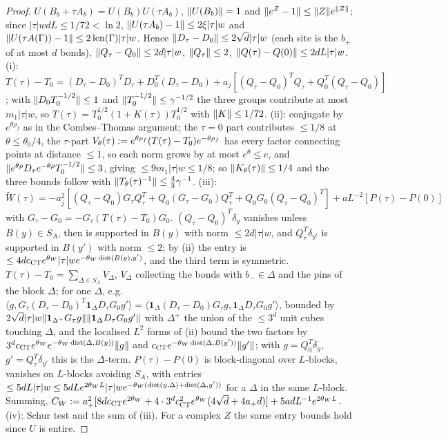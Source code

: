 \begin{proof}
$U(B_b+\tau A_b)=U(B_b)U(\tau A_b)$, $\lVert U(B_b)\rVert=1$ and $\lVert e^Z-1\rVert\le\lVert Z\rVert e^{\lVert Z\rVert}$; since $|\tau|wdL\le1/72<\ln2$, $\lVert U(\tau A_b)-1\rVert\le2\xi|\tau|w$ and $\lVert U(\tau A(\Gamma))-1\rVert\le2\,\mathrm{len}(\Gamma)|\tau|w$. Hence $\lVert D_\tau-D_0\rVert\le2\sqrt d|\tau|w$ (each site is the $b_+$ of at most $d$ bonds), $\lVert Q_\tau-Q_0\rVert\le2d|\tau|w$, $\lVert Q_\tau\rVert\le2$, $\lVert Q(\tau)-Q(0)\rVert\le2dL|\tau|w$. (i): $T(\tau)-T_0=(D_\tau-D_0)^TD_\tau+D_0^T(D_\tau-D_0)+a_j[(Q_\tau-Q_0)^TQ_\tau+Q_0^T(Q_\tau-Q_0)]$; with $\lVert D_0T_0^{-1/2}\rVert\le1$ and $\lVert T_0^{-1/2}\rVert\le\gamma^{-1/2}$ the three groups contribute at most $m_1|\tau|w$, so $T(\tau)=T_0^{1/2}(1+K(\tau))T_0^{1/2}$ with $\lVert K\rVert\le1/72$. (ii): conjugate by $e^{\theta\rho_f}$ as in the Combes--Thomas argument; the $\tau=0$ part contributes $\le1/8$ at $\theta\le\theta_0/4$, the $\tau$-part $V_\theta(\tau):= e^{\theta\rho_f}(T(\tau)-T_0)e^{-\theta\rho_f}$ has every factor connecting points at distance $\le1$, so each norm grows by at most $e^\theta\le e$, and $\lVert e^{\theta\rho}D_\tau e^{-\theta\rho}T_0^{-1/2}\rVert\le3$, giving $\le9m_1|\tau|w\le1/8$; so $\lVert K_\theta(\tau)\rVert\le1/4$ and the three bounds follow with $\lVert T_\theta(\tau)^{-1}\rVert\le\frac43\gamma^{-1}$. (iii): $\tilde W(\tau)=-a_j^2[(Q_\tau-Q_0)G_\tau Q_\tau^T+Q_0(G_\tau-G_0)Q_\tau^T+Q_0G_0(Q_\tau-Q_0)^T]+aL^{-2}[P(\tau)-P(0)]$ with $G_\tau-G_0=-G_\tau(T(\tau)-T_0)G_0$. $(Q_\tau-Q_0)^T\delta_y$ vanishes unless $B(y)\in S_A$, then is supported in $B(y)$ with norm $\le2d|\tau|w$, and $Q_\tau^T\delta_{y'}$ is supported in $B(y')$ with norm $\le2$; by (ii) the entry is $\le4dc_{\mathrm{CT}}e^{\theta_W}|\tau|we^{-\theta_W\operatorname{dist}(B(y),y')}$, and the third term is symmetric. $T(\tau)-T_0=\sum_{\Delta\in S_A}V_\Delta$, $V_\Delta$ collecting the bonds with $b_-\in\Delta$ and the pins of the block $\Delta$; for one $\Delta$, e.g.\ $\langle g,G_\tau(D_\tau-D_0)^T\mathbf 1_\Delta D_\tau G_0g'\rangle=\langle\mathbf 1_\Delta(D_\tau-D_0)G_\tau g,\mathbf 1_\Delta D_\tau G_0g'\rangle$, bounded by $2\sqrt d|\tau|w\lVert \mathbf 1_{\Delta^+}G_\tau g\rVert\lVert \mathbf 1_\Delta D_\tau G_0g'\rVert$ with $\Delta^+$ the union of the $\le3^d$ unit cubes touching $\Delta$, and the localised $L^2$ forms of (ii) bound the two factors by $3^dc_{\mathrm{CT}}e^{\theta_W}e^{-\theta_W\operatorname{dist}(\Delta,B(y))}\lVert g\rVert$ and $c_{\mathrm{CT}}e^{-\theta_W\operatorname{dist}(\Delta,B(y'))}\lVert g'\rVert$; with $g=Q_0^T\delta_y$, $g'=Q_\tau^T\delta_{y'}$ this is the $\Delta$-term. $P(\tau)-P(0)$ is block-diagonal over $L$-blocks, vanishes on $L$-blocks avoiding $S_A$, with entries $\le5dL|\tau|w\le5dLe^{2\theta_WL}|\tau|we^{-\theta_W(\operatorname{dist}(y,\Delta)+\operatorname{dist}(\Delta,y'))}$ for a $\Delta$ in the same $L$-block. Summing, $C_W:= a_+^2[8dc_{\mathrm{CT}}e^{2\theta_W}+4\cdot3^dc_{\mathrm{CT}}^2e^{\theta_W}(4\sqrt d+4a_+d)]+5adL^{-1}e^{2\theta_WL}$. (iv): Schur test and the sum of (iii). For a complex $Z$ the same entry bounds hold since $U$ is entire.
\end{proof}


